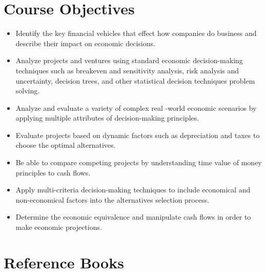 \documentclass[letterpaper]{inzane_syllabus} %
\begin{document}
\vspace{0.1 cm} 
\section{Course Objectives}
\vspace{0.05 cm} 
\begin{itemize}[label= \color{myCOLOR}{$\RHD$}]
        \item Identify the key financial vehicles that effect how companies do business and describe their impact on economic decisions.
        \vspace{0.1 cm}
        \item Analyze projects and ventures using standard economic decision-making techniques such as breakeven and sensitivity analysis, risk analysis and uncertainty, decision trees, and other statistical decision techniques problem solving.
        \vspace{0.1 cm}
        \item Analyze and evaluate a variety of complex real -world economic scenarios by applying  multiple attributes of decision-making principles.
        \vspace{0.1 cm}
        \item Evaluate projects based on dynamic factors such as depreciation and taxes to choose the optimal alternatives.
        \item Be able to compare competing projects by understanding time value of money principles to cash flows.
        \item Apply multi-criteria decision-making techniques to include economical and non-economical factors into the alternatives selection process.
        \item Determine the economic equivalence and manipulate cash flows in order to make economic projections.
\end{itemize}

\vspace{0.3cm}
\section{Reference Books}
\vspace{0.05cm}
\end{document}
